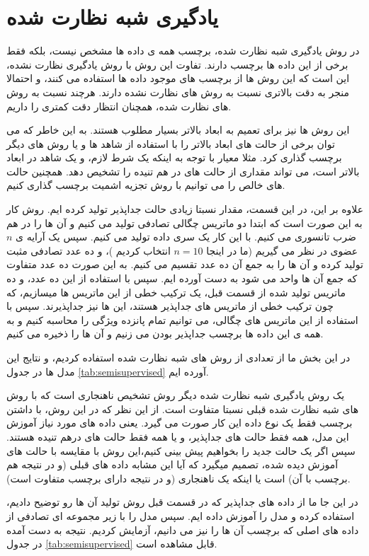 \section{یادگیری شبه نظارت شده}

در روش یادگیری شبه نظارت شده، برچسب همه ی داده ها مشخص نیست، بلکه فقط برخی از این داده ها برچسب دارند. تفاوت این روش با روش یادگیری نظارت نشده، این است که این روش ها از برچسب های موجود داده ها استفاده می کنند، و احتمالا منجر به دقت بالاتری نسبت به روش های نظارت نشده دارند. هرچند نسبت به روش های نظارت شده، همچنان انتظار دقت  کمتری را داریم.

این روش ها نیز برای تعمیم به ابعاد بالاتر بسیار مطلوب هستند. به این خاطر که می توان برخی از حالت های ابعاد بالاتر را با استفاده از شاهد ها و یا روش های دیگر برچسب گذاری کرد. مثلا معیار
با توجه به اینکه یک شرط لازم، و یک شاهد در ابعاد بالاتر است، می تواند مقداری از حالت های در هم تنیده را تشخیص دهد. همچنین حالت های خالص را می توانیم با روش تجزیه اشمیت برچسب گذاری کنیم.

علاوه بر این، در این قسمت، مقدار نسبتا زیادی حالت جداپذیر تولید کرده ایم. روش کار به این صورت است که
ابتدا دو ماتریس چگالی تصادفی تولید می کنیم و آن ها را در هم ضرب تانسوری می کنیم. با این کار یک سری داده تولید می کنیم. سپس یک آرایه ی
$n$
عضوی در نظر می گیریم (‌ما در اینجا
$n=10$
انتخاب کردیم
)،
و ده عدد تصادفی مثبت تولید کرده و آن ها را به جمع آن ده عدد تقسیم می کنیم. به این صورت ده عدد متفاوت که جمع آن ها واحد می شود به دست آورده ایم. سپس با استفاده از این ده عدد، و ده ماتریس تولید شده از قسمت قبل، یک ترکیب خطی از این ماتریس ها میسازیم، که چون ترکیب خطی از ماتریس های جداپذیر هستند، ‌این ها نیز جداپذیرند. سپس با استفاده از این ماتریس های چگالی، می توانیم تمام پانزده ویژگی را محاسبه کنیم و به همه ی این داده ها برچسب جداپذیر بودن می زنیم و آن ها را ذخیره می کنیم.

در این بخش ما از تعدادی از روش های شبه نظارت شده استفاده کردیم، و نتایج این مدل ها در جدول
\ref{tab:semisupervised}
آورده ایم.

یک روش یادگیری شبه نظارت شده دیگر روش تشخیص ناهنجاری است که با روش های شبه نظارت شده قبلی نسبتا متفاوت است. از این نظر که در این روش، با داشتن برچسب فقط یک نوع داده این کار صورت می گیرد. یعنی داده های مورد نیاز آموزش این مدل، همه فقط حالت های جداپذیر، و یا همه فقط حالت های درهم تنیده هستند. سپس اگر یک حالت جدید را بخواهیم پیش بینی کنیم،‌این روش با مقایسه با حالت های آموزش دیده شده، تصمیم میگیرد که آیا این مشابه داده های قبلی (و در نتیجه هم برچسب با آن) است یا اینکه یک ناهنجاری (و در نتیجه دارای برچسب متفاوت است).

در این جا ما از داده های جداپذیر که در قسمت قبل روش تولید آن ها رو توضیح دادیم، استفاده کرده و مدل را آموزش داده ایم. سپس مدل را با زیر مجموعه ای تصادفی از داده های اصلی که برچسب آن ها را نیز می دانیم، آزمایش کردیم. نتیجه به دست آمده در جدول
\ref{tab:semisupervised}
قابل مشاهده است.



